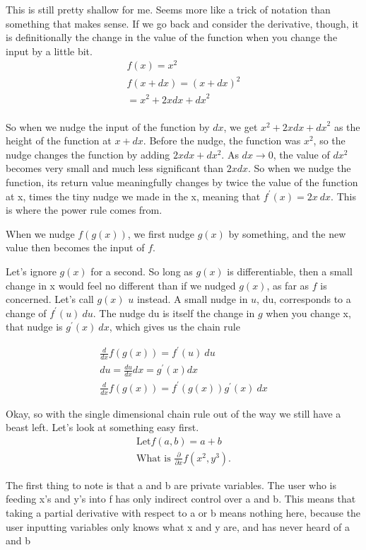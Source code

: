\documentclass[12pt, letterpaper]{article}
\begin{document}
This is still pretty shallow for me. Seems more like a trick of notation than something that makes sense. If we go back and consider the derivative, though, it is definitionally the change in the value of the function when you change the input by a little bit.
\begin{gather*}
    f(x) = x^2\\
    f(x + dx) = (x+dx)^2\\
    = x^2 + 2xdx + {dx}^2\\
\end{gather*}

So when we nudge the input of the function by $dx$, we get $x^2 + 2xdx + {dx}^2$ as the height of the function at $x + dx$. Before the nudge, the function was $x^2$, so the nudge changes the function by adding $2xdx + dx^2$. As $dx \to 0$, the value of $dx^2$ becomes very small and much less significant than $2xdx$. So when we nudge the function, its return value meaningfully changes by twice the value of the function at x, times the tiny nudge we made in the x, meaning that $f^\prime (x) = 2x\ dx$. This is where the power rule comes from.

When we nudge $f(g(x))$, we first nudge $g(x)$ by something, and the new value then becomes the input of $f$.

Let's ignore $g(x)$ for a second. So long as $g(x)$ is differentiable, then a small change in x would feel no different than if we nudged $g(x)$, as far as $f$ is concerned. 
Let's call $g(x)$ $u$ instead. A small nudge in $u$, du, corresponds to a change of $f^\prime (u)\ du$. The nudge du is itself the change in $g$ when you change x, that nudge is $g^\prime (x)\ dx$, which gives us the chain rule

\begin{gather*}
    \frac{d}{dx} f(g(x)) = f^\prime (u)\ du\\
    du = \frac{du}{dx}dx = g^\prime (x) dx\\
    \frac{d}{dx} f(g(x)) = f^\prime (g(x)) g^\prime (x)\ dx
\end{gather*}

Okay, so with the single dimensional chain rule out of the way we still have a beast left. Let's look at something easy first.
\begin{gather*}
    \text{Let} f(a, b) = a + b\\
    \text{What is } \frac{\partial}{\partial x}f(x^2, y^3).
\end{gather*}

The first thing to note is that a and b are private variables. The user who is feeding x's and y's into f has only indirect control over a and b. This means that taking a partial derivative with respect to a or b means nothing here, because the user inputting variables only knows what x and y are, and has never heard of a and b
\end{document}
